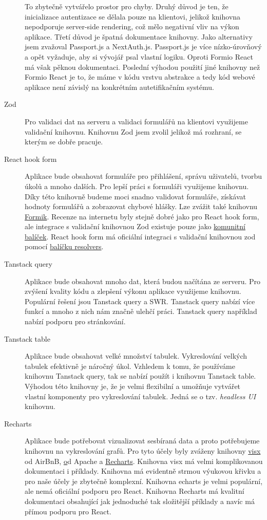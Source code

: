 \begin{description}
    To zbytečně vytvářelo prostor pro chyby.
    Druhý důvod je ten, že inicializace autentizace se dělala pouze na klientovi, jelikož knihovna nepodporuje server-side rendering, což mělo negativní vliv na výkon aplikace.
    Třetí důvod je špatná dokumentace knihovny.
    Jako alternativy jsem zvažoval Passport.js a NextAuth.js.
    Passport.js je více nízko-úrovňový a opět vyžaduje, aby si vývojář psal vlastní logiku.
    Oproti Formio React má však pěknou dokumentaci.
    Poslední výhodou použití jiné knihovny než Formio React je to, že máme v kódu vrstvu abstrakce a tedy kód webové aplikace není závislý na konkrétním autetifikačním systému.
    \item[Zod]
    Pro validaci dat na serveru a validaci formulářů na klientovi využijeme validační knihovnu.
    Knihovnu Zod jsem zvolil jelikož má rozhraní, se kterým se dobře pracuje.
    \item[React hook form]
    Aplikace bude obsahovat formuláře pro přihlášení, správu uživatelů, tvorbu úkolů a mnoho dalších.
    Pro lepší práci s formuláři využijeme knihovnu.
    Díky této knihovně budeme moci snadno validovat formuláře, získávat hodnoty formulářů a zobrazovat chybové hlášky.
    Lze zvážit také knihovnu \href{https://formik.org}{Formik}.
    Recenze na internetu byly stejně dobré jako pro React hook form, ale integrace s validační knihovnou Zod existuje pouze jako \href{https://github.com/robertLichtnow/zod-formik-adapter}{komunitní balíček}.
    React hook form má oficiální integraci s validační knihovnou zod pomocí \href{https://github.com/react-hook-form/resolvers}{balíčku resolvers}.
    \item[Tanstack query]
    Aplikace bude obsahovat mnoho dat, která budou načítána ze serveru.
    Pro zvýšení kvality kódu a zlepšení výkonu aplikace využijeme knihovnu.
    Populární řešení jsou Tanstack query a SWR\@.
    Tanstack query nabízí více funkcí a mnoho z nich nám značně ulehčí práci.
    Tanstack query například nabízí podporu pro stránkování.
    \item[Tanstack table]
    Aplikace bude obsahovat velké množství tabulek.
    Vykreslování velkých tabulek efektivně je náročný úkol.
    Vzhledem k tomu, že používáme knihovnu Tanstack query, tak se nabízí použít i knihovnu Tanstack table.
    Výhodou této knihovny je, že je velmi flexibilní a umožňuje vytvářet vlastní komponenty pro vykreslování tabulek.
    Jedná se o tzv. \textit{headless UI} knihovnu.
    \item[Recharts]
    Aplikace bude potřebovat vizualizovat sesbíraná data a proto potřebujeme knihovnu na vykreslování grafů.
    Pro tyto účely byly zváženy knihovny \href{https://github.com/airbnb/visx}{visx} od AirBnB, \href{https://github.com/apache/echarts} od Apache a \href{https://github.com/recharts/recharts}{Recharts}.
    Knihovna visx má velmi komplikovanou dokumentaci i příklady.
    Knihovna má evidentně strmou výukovou křivku a pro naše účely je zbytečně komplexní.
    Knihovna echarts je velmi populární, ale nemá oficiální podporu pro React.
    Knihovna Recharts má kvalitní dokumentaci obsahující jak jednoduché tak složitější příklady a navíc má přímou podporu pro React.
\end{description}

